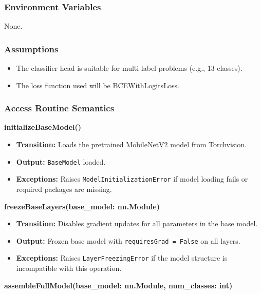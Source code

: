 \documentclass[12pt, titlepage]{article}
\begin{document}
\subsubsection{Environment Variables}
\label{sec:ModelArchitectureEnvVariables}

None.

\subsubsection{Assumptions}
\label{sec:ModelArchitectureAssumptions}

\begin{itemize}
    \item The classifier head is suitable for multi-label problems (e.g., 13 classes).
    \item The loss function used will be BCEWithLogitsLoss.
\end{itemize}

\subsubsection{Access Routine Semantics}
\label{sec:ModelArchitectureAccessRoutineSemantics}

\textbf{initializeBaseModel()}

\begin{itemize}
    \item \textbf{Transition:} Loads the pretrained MobileNetV2 model from Torchvision.
    \item \textbf{Output:} \texttt{BaseModel} loaded.
    \item \textbf{Exceptions:} Raises \texttt{ModelInitializationError} if model loading fails or required packages are missing.
\end{itemize}

\textbf{freezeBaseLayers(base\_model: nn.Module)}

\begin{itemize}
    \item \textbf{Transition:} Disables gradient updates for all parameters in the base model.
    \item \textbf{Output:} Frozen base model with \texttt{requiresGrad = False} on all layers.
    \item \textbf{Exceptions:} Raises \texttt{LayerFreezingError} if the model structure is incompatible with this operation.
\end{itemize}

\textbf{assembleFullModel(base\_model: nn.Module, num\_classes: int)}
\end{document}
